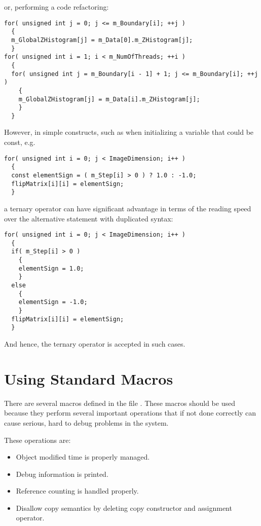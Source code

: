 or, performing a code refactoring:

\small
\begin{verbatim}
for( unsigned int j = 0; j <= m_Boundary[i]; ++j )
  {
  m_GlobalZHistogram[j] = m_Data[0].m_ZHistogram[j];
  }
for( unsigned int i = 1; i < m_NumOfThreads; ++i )
  {
  for( unsigned int j = m_Boundary[i - 1] + 1; j <= m_Boundary[i]; ++j )
    {
    m_GlobalZHistogram[j] = m_Data[i].m_ZHistogram[j];
    }
  }
\end{verbatim}
\normalsize

However, in simple constructs, such as when initializing a variable that could
be const, e.g.

\small
\begin{verbatim}
for( unsigned int i = 0; j < ImageDimension; i++ )
  {
  const elementSign = ( m_Step[i] > 0 ) ? 1.0 : -1.0;
  flipMatrix[i][i] = elementSign;
  }
\end{verbatim}
\normalsize

a ternary operator can have significant advantage in terms of the reading speed
over the alternative  statement with duplicated syntax:

\small
\begin{verbatim}
for( unsigned int i = 0; j < ImageDimension; i++ )
  {
  if( m_Step[i] > 0 )
    {
    elementSign = 1.0;
    }
  else
    {
    elementSign = -1.0;
    }
  flipMatrix[i][i] = elementSign;
  }
\end{verbatim}
\normalsize

And hence, the ternary operator is accepted in such cases.


\section{Using Standard Macros}
\label{sec:UsingStandardMacros}

There are several macros defined in the file . These macros
should be used because they perform several important operations that if not
done correctly can cause serious, hard to debug problems in the system.

These operations are:
\begin{itemize}
\item Object modified time is properly managed.
\item Debug information is printed.
\item Reference counting is handled properly.
\item Disallow copy semantics by deleting copy constructor and assignment
operator.
\end{itemize}

